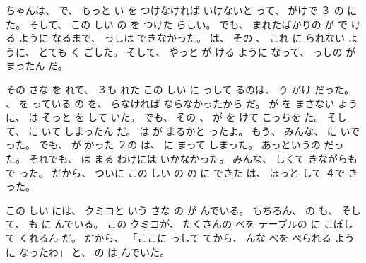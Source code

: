 \documentclass[a5paper, 10pt]{tekst}
\begin{document}
	{\Large\sloppy
		\noindent{}ちゃんは、  で、 もっと い を つけなければ いけないと って、 がけで ３ の に た。 そして、 この しい の を つけた らしい。 でも、 まれたばかりの が で ける ように なるまで、 っしは できなかった。 は、 その 、 これ  に られない ように、 とても く ごした。 そして、 やっと が ける ように なって、 っしの が まったん だ。
		
		\noindent その さな を れて、 ３も れた この しい に っして るのは、 り がけ だった。 、 を っている の を、 らなければ ならなかったから だ。 が を まさない ように、 は そっと を して いた。 でも、 その 、 が を けて こっちを た。 そして、 に いて しまったん だ。 は が まるかと ったよ。 もう、 みんな、 に いで った。 でも、 が かった ２の は、 に まって しまった。 あっというの  だった。 それでも、 は まる わけには いかなかった。 みんな、 しくて きながらも で った。 だから、 ついに この しい の の に  できた は、 ほっと して  ４で きった。
		
		\noindent この しい には、 クミコと いう さな の が んでいる。 もちろん、 の も、 そして、 も に んでいる。 この クミコが、  たくさんの べを テーブルの に こぼして くれるん だ。 だから、 「ここに っして てから、 んな べを べられる ように なったわ」 と、 の は んでいた。
		
	}\clearpage
\end{document}
